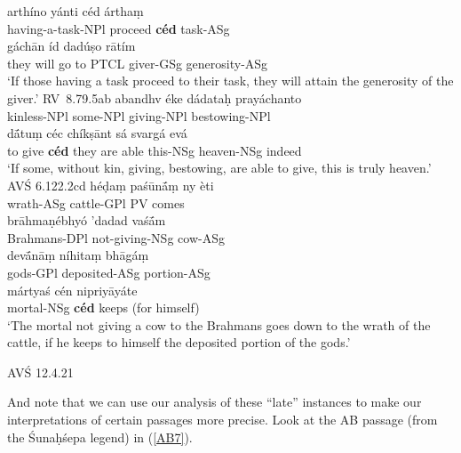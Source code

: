 \documentclass[output=paper,
modfonts
]{LSP/langsci}
\begin{document}
\begin{exe}
\ex
	\begin{xlist}
	\ex\gll {\ob}arthíno{\cb} yánti céd árthaṃ \\
			{\db}having-a-task-NPl proceed \textbf{céd} task-ASg \\
			
		\gll gáchān íd dadúṣo rātím \\
			{they will go to} PTCL giver-GSg generosity-ASg \\
		\glt `If those having a task proceed to their task, they will attain the generosity of the giver.' \hfill \mbox{RV 8.79.5ab}
	\ex\gll {\ob}abandhv éke dádataḥ prayáchanto{\cb} \\
			{\db}kinless-NPl some-NPl giving-NPl bestowing-NPl \\
			
		\gll dā́tuṃ céc chíkṣānt sá svargá evá \\
			{to give} \textbf{céd} {they are able} this-NSg heaven-NSg indeed \\
		\glt `If some, without kin, giving, bestowing, are able to give, this is truly heaven.' \hfill {AVŚ 6.122.2cd}
	\ex\gll héḍaṃ paśūnā́ṃ ny èti \\
			wrath-ASg cattle-GPl PV comes \\
			
		\gll brāhmaṇébhyó 'dadad vaśā́m \\
			Brahmans-DPl not-giving-NSg cow-ASg \\
			
		\gll {\ob}devā́nāṃ níhitaṃ bhāgáṃ{\cb} \\
			{\db}gods-GPl deposited-ASg portion-ASg \\
			
		\gll mártyaś cén nipriyāyáte \\
			mortal-NSg \textbf{céd} {keeps (for himself)} \\
		\glt `The mortal not giving a cow to the Brahmans goes down to the wrath of the cattle, if he keeps to himself the deposited portion of the gods.'
		
		\hfill {AVŚ 12.4.21}
	\end{xlist}
\end{exe}

\noindent And note that we can use our analysis of these ``late'' instances to make our interpretations of certain
 passages more precise. Look at the AB passage (from the Śunaḥśepa legend) in (\ref{AB7}).

\end{document}
